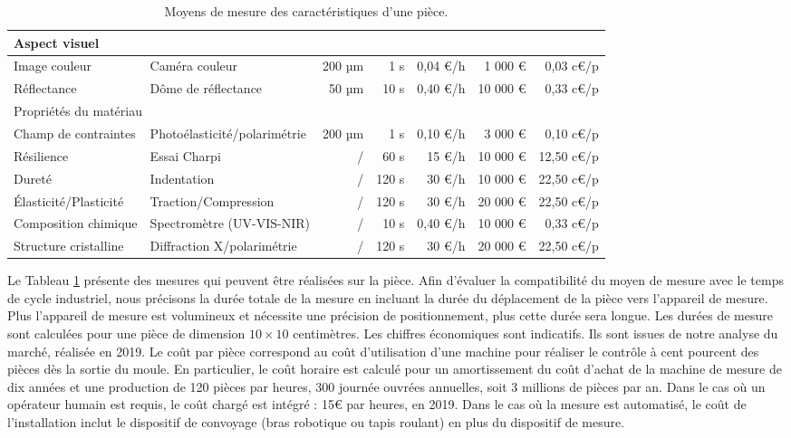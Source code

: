 \begin{table}[htpb]
\begin{tabular}{|l|l|r|r|r|r|r|}
		\hline
		\multicolumn{7}{|l|}{Aspect visuel} \\ \hline
		Image couleur & Caméra couleur & 200 µm & 1 s & 0,04 €/h & 1 000 € & 0,03 c€/p \\ \hline
		Réflectance & Dôme de réflectance & 50 µm & 10 s & 0,40 €/h & 10 000 € & 0,33 c€/p \\ \hline
		\hline
		\multicolumn{7}{|l|}{Propriétés du matériau} \\ \hline
		Champ de contraintes & Photoélasticité/polarimétrie & 200 µm & 1 s & 0,10 €/h & 3 000 € & 0,10 c€/p \\ \hline
		Résilience & Essai Charpi & / & 60 s & 15 €/h & 10 000 € & 12,50 c€/p \\ \hline
		Dureté & Indentation & / & 120 s & 30 €/h & 10 000 € & 22,50 c€/p \\ \hline
		Élasticité/Plasticité & Traction/Compression & / & 120 s & 30 €/h & 20 000 € & 22,50 c€/p \\ \hline
		Composition chimique & Spectromètre (UV-VIS-NIR) & / & 10 s & 0,40 €/h & 10 000 € & 0,33 c€/p \\ \hline
		Structure cristalline & Diffraction X/polarimétrie & / & 120 s & 30 €/h & 20 000 € & 22,50 c€/p \\ \hline
	\end{tabular}
	\caption{Moyens de mesure des caractéristiques d'une pièce.}
	\label{tab:product_measurements}
\end{table}

Le Tableau \ref{tab:product_measurements} présente des mesures qui peuvent être réalisées sur la pièce.
Afin d'évaluer la compatibilité du moyen de mesure avec le temps de cycle industriel, nous précisons la durée totale de la mesure en incluant la durée du déplacement de la pièce vers l'appareil de mesure.
Plus l'appareil de mesure est volumineux et nécessite une précision de positionnement, plus cette durée sera longue.
Les durées de mesure sont calculées pour une pièce de dimension $10 \times 10$ centimètres.
Les chiffres économiques sont indicatifs.
Ils sont issues de notre analyse du marché, réalisée en 2019.
Le coût par pièce correspond au coût d'utilisation d'une machine pour réaliser le contrôle à cent pourcent des pièces dès la sortie du moule.
En particulier, le coût horaire est calculé pour un amortissement du coût d'achat de la machine de mesure de dix années et une production de 120 pièces par heures, 300 journée ouvrées annuelles, soit 3 millions de pièces par an.
Dans le cas où un opérateur humain est requis, le coût chargé est intégré : 15€ par heures, en 2019.
Dans le cas où la mesure est automatisé, le coût de l'installation inclut le dispositif de convoyage (bras robotique ou tapis roulant) en plus du dispositif de mesure.

